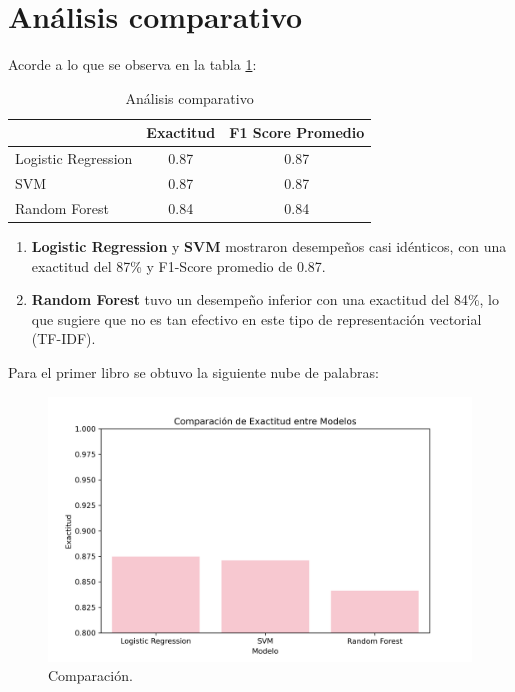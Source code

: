 \documentclass[conference]{IEEEtran}
\begin{document}
\section{Análisis comparativo}

Acorde a lo que se observa en la tabla \ref{tab:comparación}:

\begin{table}[h!]
    \centering
    \begin{tabular}{| l | c | c |}
    \rowcolor[HTML]{FFCCC9} 
    \hline
        \multicolumn{1}{c}{\cellcolor[HTML]{FFCCC9}\textbf{Modelo}} & \textbf{Exactitud} & \textbf{F1 Score Promedio} \\ \hline
        Logistic Regression & 0.87 & 0.87 \\
        SVM & 0.87 & 0.87 \\
        Random Forest & 0.84 & 0.84 \\ \hline
    \end{tabular}
    \caption{Análisis comparativo}
    \label{tab:comparación}
\end{table}

\FloatBarrier

\begin{enumerate}
    \item \textbf{Logistic Regression} y \textbf{SVM} mostraron desempeños casi idénticos, con una exactitud del 87\% y F1-Score promedio de 0.87.
     
    \item \textbf{Random Forest} tuvo un desempeño inferior con una exactitud del 84\%, lo que sugiere que no es tan efectivo en este tipo de representación vectorial (TF-IDF).
\end{enumerate}

Para el primer libro se obtuvo la siguiente nube de palabras:

\begin{figure}[h]
    \centering
    \includegraphics[width=0.8\linewidth]{Comparacion_Modelos.png}
    \caption{Comparación.}
    \label{fig:comp}
\end{figure}
\end{document}
